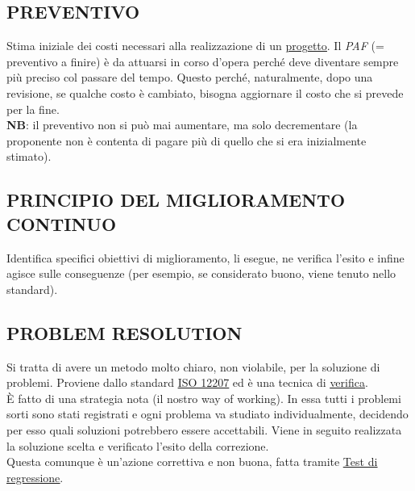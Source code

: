 		\subsection{PREVENTIVO}  \label{preventivo}
		Stima iniziale dei costi necessari alla realizzazione di un \underline{\hyperref[progetto]{progetto}}.
		Il \textit{PAF} (= preventivo a finire) è da attuarsi in corso d'opera perché deve diventare sempre più preciso col passare del tempo. Questo perché, naturalmente, dopo una revisione, se qualche costo è cambiato, bisogna aggiornare il costo che si prevede per la fine. \\
		\textbf{NB}: il preventivo non si può mai aumentare, ma solo decrementare (la proponente non è contenta di pagare più di quello che si era inizialmente stimato).



		\subsection{PRINCIPIO DEL MIGLIORAMENTO CONTINUO}  \label{miglioramentocontinuo}
		Identifica specifici obiettivi di miglioramento, li esegue, ne verifica l'esito e infine agisce sulle conseguenze (per esempio, se considerato buono, viene tenuto nello standard).


		\subsection{PROBLEM RESOLUTION}		\label{problemsolution}
		Si tratta di avere un metodo molto chiaro, non violabile, per la soluzione di problemi. Proviene dallo standard \underline{\hyperref[12207]{ISO 12207}} ed è una tecnica di \underline{\hyperref[verificare]{verifica}}. \\
		È fatto di una strategia nota (il nostro way of working). In essa tutti i problemi sorti sono stati registrati e ogni problema va studiato individualmente, decidendo per esso quali soluzioni potrebbero essere accettabili. Viene in seguito realizzata la soluzione scelta e verificato l'esito della correzione. \\ %
		Questa comunque è un'azione correttiva e non buona,
		 fatta tramite \underline{\hyperref[testregressione]{Test di regressione}}.


